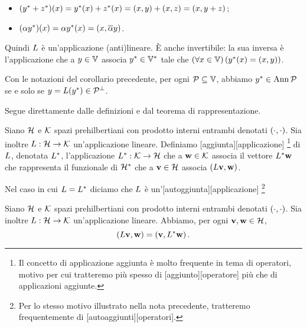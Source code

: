 \begin{itemize}
	\item $({{y}^*} + {{z}^*})(x) = {{y}^*}(x) + {{z}^*}(x) = \left ( x , y \right ) + \left ( x , z \right ) = \left ( x , y + z \right )$;
	\item $(\alpha {{y}^*})(x) = \alpha {{y}^*}(x) = \left ( x , \overline{\alpha}y \right )$.
\end{itemize}
\par Quindi $L$ \`e un'applicazione (anti)lineare. \`E anche invertibile: la sua inversa \`e l'applicazione che a $y \in \mathbb{V}$ associa ${{y}^*} \in {{\mathbb{V}}^*}$ tale che $\left ( \forall x \in \mathbb{V} \right ) \left ( {{y}^*}(x) = \left ( x , y \right ) \right )$. \EndProof
\begin{Corollary}
	Con le notazioni del corollario precedente, per ogni $\mathcal{P} \subseteq \mathbb{V}$, abbiamo ${{y}^*} \in \operatorname{Ann}{\mathcal{P}}$ se e solo se $y = L({{y}^*}) \in {\mathcal{P}}^\perp$.
\end{Corollary}
\Proof Segue direttamente dalle definizioni e dal teorema di rappresentazione. \EndProof
\begin{Definition}
  Siano $\mathcal{H}$ e $\mathcal{K}$ spazi prehilbertiani con
  prodotto interni entrambi denotati
  $\left ( \cdot , \cdot \right )$.
  Sia inoltre
  $L: \mathcal{H} \rightarrow \mathcal{K}$
  un'applicazione lineare.
  Definiamo
  [aggiunta][applicazione]
  \footnote{Il concetto di applicazione aggiunta \`e molto frequente in tema di
  operatori, motivo per cui tratteremo pi\`u spesso di
  [aggiunto][operatore] pi\`u che di
  applicazioni aggiunte.}
  di $L$, denotata ${L}^*$, l'applicazione
  ${L}^*: \mathcal{K} \rightarrow \mathcal{H}$
  che a $\mathbf{w} \in \mathcal{K}$ associa il vettore
  ${L}^*\mathbf{w}$ che rappresenta il funzionale di
  ${{\mathcal{H}}^*}$ che a $\mathbf{v} \in \mathcal{H}$ associa
  $\left ( L\mathbf{v} , \mathbf{w} \right )$.
  \par Nel caso in cui $L = {L}^*$ diciamo che $L$ \`e
  un'[autoggiunta][applicazione]
  \footnote{Per lo stesso motivo illustrato nella nota precedente, tratteremo
  frequentemente di
  [autoaggiunti][operatori].}
\end{Definition}
\begin{Theorem}
  Siano $\mathcal{H}$ e $\mathcal{K}$ spazi prehilbertiani con
  prodotto interni entrambi denotati
  $\left ( \cdot , \cdot \right )$.
  Sia inoltre
  $L: \mathcal{H} \rightarrow \mathcal{K}$
  un'applicazione lineare.
  Abbiamo, per ogni $\mathbf{v}, \mathbf{w} \in \mathcal{H}$,
  \[
    \left ( L\mathbf{v} , \mathbf{w} \right )
      = \left ( \mathbf{v} , {L}^*\mathbf{w} \right ).
  \]
\end{Theorem}
